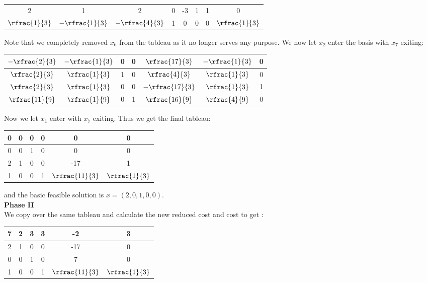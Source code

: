 \documentclass{article}
\begin{document}
\begin{jacklist}
\begin{center}
\begin{tabular}{|c|ccccccc|}
            2&1&2&0&-3&1&1&0\\
            $\rfrac{1}{3}$&$-\rfrac{1}{3}$&$-\rfrac{4}{3}$&1&0&0&0&$\rfrac{1}{3}$ \\
            \hline
        \end{tabular}
    \end{center}
    Note that we completely removed $x_6$ from the tableau as it no longer serves any purpose. We now let $x_2$ enter the basis with
    $x_7$ exiting: 
    \begin{center}
        \begin{tabular}{|c|cccccc|}
            \hline
            $-\rfrac{2}{3}$&$-\rfrac{1}{3}$&0&0&$\rfrac{17}{3}$&$-\rfrac{1}{3}$&0\\
            \hline
            $\rfrac{2}{3}$&$\rfrac{1}{3}$&1&0&$\rfrac{4}{3}$&$\rfrac{1}{3}$&0\\
            $\rfrac{2}{3}$&$\rfrac{1}{3}$&0&0&$-\rfrac{17}{3}$&$\rfrac{1}{3}$&1\\
            $\rfrac{11}{9}$&$\rfrac{1}{9}$&0&1&$\rfrac{16}{9}$&$\rfrac{4}{9}$&0\\
            \hline
        \end{tabular}
    \end{center}
    Now we let $x_1$ enter with $x_7$ exiting. Thus we get the final tableau: 
    \begin{center}
        \begin{tabular}{|c|ccccc|}
            \hline
            0&0&0&0&0&0\\
            \hline
            0&0&1&0&0&0\\
            2&1&0&0&-17&1\\
            1&0&0&1&$\rfrac{11}{3}$&$\rfrac{1}{3}$\\
            \hline
        \end{tabular}
    \end{center}
    and the basic feasible solution is $x = (2,0,1,0,0)$. \\
    \textbf{Phase II} \\
    We copy over the same tableau and calculate the new reduced cost and cost to get :
    \begin{center}
        \begin{tabular}{|c|ccccc|}
            \hline
            7&2&3&3&-2&3\\
            \hline
            2&1&0&0&-17&0\\
            0&0&1&0&7&0\\
            1&0&0&1&$\rfrac{11}{3}$&$\rfrac{1}{3}$\\

\end{tabular}
\end{center}
\end{jacklist}
\end{document}
